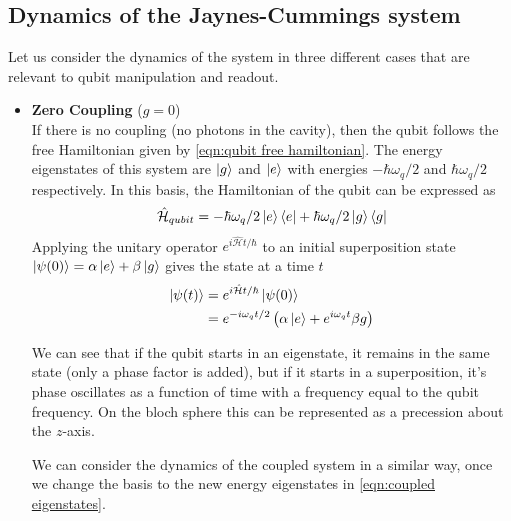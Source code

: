 \subsection{Dynamics of the Jaynes-Cummings system}

Let us consider the dynamics of the system in three different cases that are relevant to qubit manipulation and readout.
\begin{itemize}
\item \textbf{Zero Coupling} ($g=0$)\\
If there is no coupling (no photons in the cavity), then the qubit follows the free Hamiltonian given by \ref{eqn:qubit free hamiltonian}. The energy eigenstates of this system are $\ket{g}$ and $\ket{e}$ with energies $-\hbar\omega_q/2$ and $\hbar\omega_q/2$ respectively. In this basis, the Hamiltonian of the qubit can be expressed as
\begin{equation}
\hat{\mathcal{H}}_{qubit} = -\hbar\omega_q/2\ket{e}\bra{e} + \hbar\omega_q/2\ket{g}\bra{g}
\end{equation}
Applying the unitary operator $e^{i\hat{\mathcal{H}}t/\hbar}$ to an initial superposition state $\ket{\psi(0)}=\alpha\ket{e}+\beta\ket{g}$ gives the state at a time $t$
\begin{align}
\begin{split}
\ket{\psi(t)} &= e^{i\hat{\mathcal{H}}t/\hbar}\ket{\psi(0)}\\
&=e^{-i\omega_qt/2}\left(\alpha\ket{e}+e^{i\omega_q t}\beta{g}\right)
\end{split}
\end{align}


We can see that if the qubit starts in an eigenstate, it remains in the same state (only a phase factor is added), but if it starts in a superposition, it's phase oscillates as a function of time with a frequency equal to the qubit frequency. On the bloch sphere this can be represented as a precession about the $z$-axis.

We can consider the dynamics of the coupled system in a similar way, once we change the basis to the new energy eigenstates in \ref{eqn:coupled eigenstates}.


\end{itemize}
